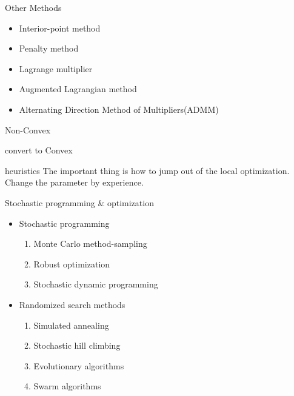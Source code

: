     \begin{frame}{Other Methods}
      \Large
      \begin{spacing}{1.5}
        \begin{itemize}
          \item Interior-point method
          \item Penalty method
          \item Lagrange multiplier
          \item Augmented Lagrangian method
          \item Alternating Direction Method of Multipliers(ADMM)
        \end{itemize}
      \end{spacing}
    \end{frame}

    \begin{frame}{Non-Convex}
      \item convert to Convex
      \item heuristics
      The important thing is how to jump out of the local optimization.
      Change the parameter by experience.
    \end{frame}

    \begin{frame}{Stochastic programming \& optimization}
      \Large
      \begin{spacing}{1.5}
      \begin{itemize}
        \item Stochastic programming
      \begin{enumerate}
        \item Monte Carlo method-sampling
        \item Robust optimization
        \item Stochastic dynamic programming
      \end{enumerate}
      \item Randomized search methods
      \begin{enumerate}
        \item Simulated annealing
        \item Stochastic hill climbing
        \item Evolutionary algorithms
        \item Swarm algorithms
      \end{enumerate}
      \end{itemize}
      \end{spacing}
    \end{frame}
